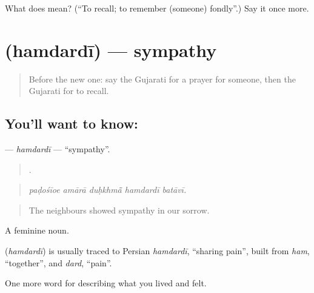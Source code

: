 \begin{tcolorbox}[breakable,colback=teal!4,colframe=teal!35!black,title={Before you move on}]
What does  mean? (\textquotedblleft{}To recall; to remember (someone) fondly\textquotedblright{}.) Say it once more.
\end{tcolorbox}
\section[\texorpdfstring{\gu{હમદર્દી} (hamdardī)}{હમદર્દી (hamdardī)}]{ (hamdardī) — sympathy}

\label{lesson:GU-C489-hamdardi}



\begin{quote}
Before the new one: say the Gujarati for a prayer for someone, then the Gujarati for to recall.
\end{quote}

\subsection*{You'll want to know: }
\textbf{} — \emph{hamdardī} — \textquotedblleft{}sympathy\textquotedblright{}.

\begin{quote}
    .
\end{quote}

\begin{quote}
\emph{paḍośīoe amārā duḥkhmā̃ hamdardī batāvī.}
\end{quote}

\begin{quote}
The neighbours showed sympathy in our sorrow.
\end{quote}

A feminine noun.

\begin{cousinweb}
\textbf{} (\emph{hamdardī}) is usually traced to Persian \emph{hamdardī}, \textquotedblleft{}sharing pain\textquotedblright{}, built from \emph{ham}, \textquotedblleft{}together\textquotedblright{}, and \emph{dard}, \textquotedblleft{}pain\textquotedblright{}.
\end{cousinweb}

\begin{grammarlens}[title={What you've built}]
One more word for describing what you lived and felt.
\end{grammarlens}


